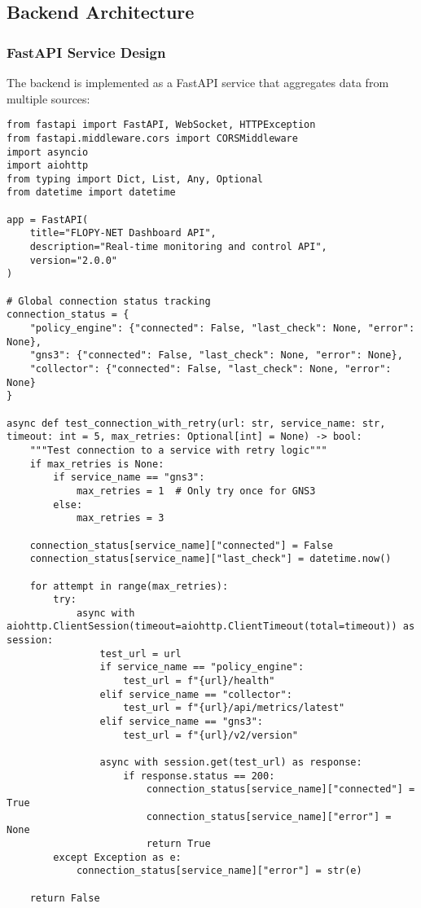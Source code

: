 \subsection{Backend Architecture}

\subsubsection{FastAPI Service Design}

The backend is implemented as a FastAPI service that aggregates data from multiple sources:

\begin{lstlisting}[style=pythoncode, caption=Dashboard Backend Structure]
from fastapi import FastAPI, WebSocket, HTTPException
from fastapi.middleware.cors import CORSMiddleware
import asyncio
import aiohttp
from typing import Dict, List, Any, Optional
from datetime import datetime

app = FastAPI(
    title="FLOPY-NET Dashboard API",
    description="Real-time monitoring and control API",
    version="2.0.0"
)

# Global connection status tracking
connection_status = {
    "policy_engine": {"connected": False, "last_check": None, "error": None},
    "gns3": {"connected": False, "last_check": None, "error": None},
    "collector": {"connected": False, "last_check": None, "error": None}
}

async def test_connection_with_retry(url: str, service_name: str, timeout: int = 5, max_retries: Optional[int] = None) -> bool:
    """Test connection to a service with retry logic"""
    if max_retries is None:
        if service_name == "gns3":
            max_retries = 1  # Only try once for GNS3
        else:
            max_retries = 3
    
    connection_status[service_name]["connected"] = False
    connection_status[service_name]["last_check"] = datetime.now()
    
    for attempt in range(max_retries):
        try:
            async with aiohttp.ClientSession(timeout=aiohttp.ClientTimeout(total=timeout)) as session:
                test_url = url
                if service_name == "policy_engine":
                    test_url = f"{url}/health"
                elif service_name == "collector":
                    test_url = f"{url}/api/metrics/latest"
                elif service_name == "gns3":
                    test_url = f"{url}/v2/version"
                
                async with session.get(test_url) as response:
                    if response.status == 200:
                        connection_status[service_name]["connected"] = True
                        connection_status[service_name]["error"] = None
                        return True
        except Exception as e:
            connection_status[service_name]["error"] = str(e)
            
    return False
\end{lstlisting}

